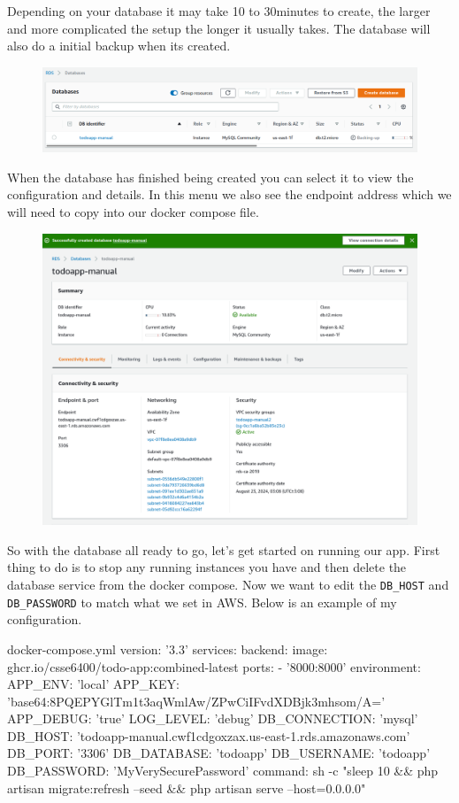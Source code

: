 \documentclass{csse4400}
\begin{document}
Depending on your database it may take 10 to 30minutes to create,
the larger and more complicated the setup the longer it usually takes.
The database will also do a initial backup when its created.

\begin{figure}[H]
  \includegraphics[width=\textwidth]{images/aws_4}
\end{figure}

When the database has finished being created you can select it to view the configuration and details.
In this menu we also see the endpoint address which we will need to copy into our docker compose file.

\begin{figure}[H]
  \includegraphics[width=\textwidth]{images/aws_5}
\end{figure}

So with the database all ready to go, let's get started on running our app.
First thing to do is to stop any running instances you have and then delete the database service from the docker compose.
Now we want to edit the \texttt{DB\_HOST} and \texttt{DB\_PASSWORD} to match what we set in AWS.
Below is an example of my configuration.

\begin{code}[language=docker-compose]{docker-compose.yml}
  version: '3.3'
  services:
    backend:
      image: ghcr.io/csse6400/todo-app:combined-latest
      ports:
        - '8000:8000'
      environment:
        APP_ENV: 'local'
        APP_KEY: 'base64:8PQEPYGlTm1t3aqWmlAw/ZPwCiIFvdXDBjk3mhsom/A='
        APP_DEBUG: 'true'
        LOG_LEVEL: 'debug'
        DB_CONNECTION: 'mysql'
        DB_HOST: 'todoapp-manual.cwf1cdgoxzax.us-east-1.rds.amazonaws.com'
        DB_PORT: '3306'
        DB_DATABASE: 'todoapp'
        DB_USERNAME: 'todoapp'
        DB_PASSWORD: 'MyVerySecurePassword'
      command: sh -c "sleep 10 && php artisan migrate:refresh --seed && php artisan serve --host=0.0.0.0"
\end{code}
\end{document}
